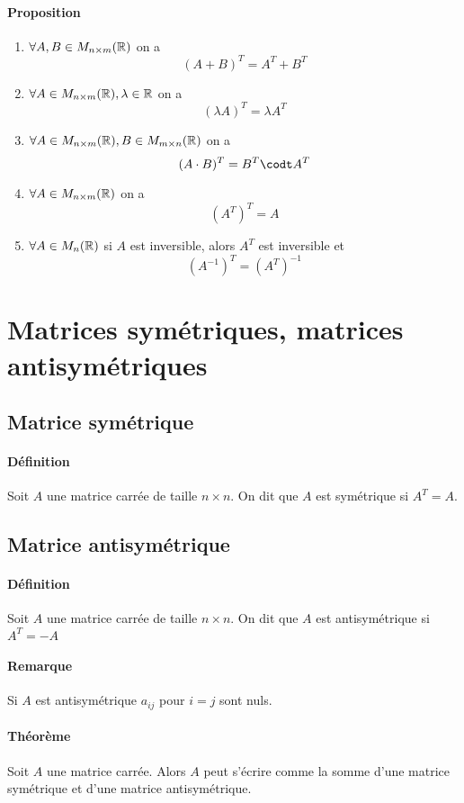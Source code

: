 \paragraph*{Proposition}
\begin{enumerate}[1)]
  \item $\forall A, B \in M_{n\times m}(\mathbb{R})$ on a
    $$(A + B)^{T} = A^{T} + B^{T}$$
  \item $\forall A \in M_{n\times m}(\mathbb{R}), \lambda \in \mathbb{R}$ on a
    $$(\lambda A)^{T} = \lambda A^{T}$$
  \item $\forall A \in M_{n\times m}(\mathbb{R}), B \in M_{m\times n}(\mathbb{R})$ on a
    $$(A \cdot B)^{T} = B^{T} \codt A^{T}$$
  \item $\forall A \in M_{n\times m}(\mathbb{R})$ on a
    $$(A^{T})^{T} = A$$
  \item $\forall A \in M_{n}(\mathbb{R})$ si $A$ est inversible, alors $A^{T}$ est inversible et 
    $$(A^{-1})^{T} = (A^{T})^{-1}$$
\end{enumerate}

%
%
\section{Matrices symétriques, matrices antisymétriques}
%
%
%
\subsection{Matrice symétrique}
%
\paragraph{Définition} Soit $A$ une matrice carrée de taille $n\times n$. On dit que $A$ est symétrique si $A^{T} = A$.

%
\subsection{Matrice antisymétrique}
%
\paragraph{Définition} Soit $A$ une matrice carrée de taille $n\times n$. On dit que $A$ est antisymétrique si $A^{T} = -A$
\paragraph{Remarque} Si $A$ est antisymétrique $a_{ij}$ pour $i=j$ sont nuls.

\paragraph{Théorème} Soit $A$ une matrice carrée. Alors $A$ peut s'écrire comme la somme d'une matrice symétrique et d'une matrice antisymétrique.

